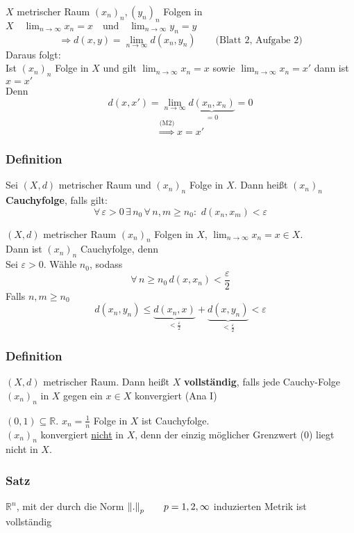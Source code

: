  $X$ metrischer Raum $(x_n)_n , (y_n)_n$ Folgen in $X \quad \lim_{n \to \infty}x_n=x \quad \text{und} \quad \lim_{n \to \infty}y_n=y$
\[
	\Rightarrow d(x,y)=\lim_{n \to \infty}d(x_n,y_n) \qquad \text{(Blatt 2, Aufgabe 2)}
\]
Daraus folgt: \\ Ist $(x_n)_n $ Folge in $X$ und gilt $\lim_{n \to \infty}x_n=x$ sowie $\lim_{n \to \infty}x_n=x'$ dann ist $x=x'$ \\
Denn \[
	d(x,x')=\lim_{n \to \infty}\underset{=0}{\underbrace{d(x_n,x_n)}}=0
\]
\[
	\stackrel{\text{(M2)}}{\Rightarrow} x=x'
\] \bewende

\subsubsection[Cauchyfolge im metrischen Raum]{Definition} %
\label{ssub:definition}
Sei $(X,d)$ metrischer Raum und $(x_n)_n $ Folge in $X$. Dann heißt $(x_n)_n$ {\bfseries Cauchyfolge}, falls gilt:
\[
	\forall\, \varepsilon >0 \, \exists \, n_0 \, \forall\, n,m \geq n_0: \,\, d(x_n,x_m)<\varepsilon 
\]

 $(X,d)$ metrischer Raum $(x_n)_n $ Folgen in $X$, $\lim_{n \to \infty}x_n=x \in X$. \\
Dann ist $(x_n)_n$ Cauchyfolge, denn \\
Sei $\varepsilon >0$. Wähle $n_0$, sodass \[  \forall\, n \geq n_0 \, d(x,x_n)< \frac{\varepsilon}{2} \]
Falls $n,m \geq n_0$
\[
	d(x_n,y_n) \leq \underset{<\frac{\varepsilon}{2}}{\underbrace{d(x_n,x)}} + \underset{<\frac{\varepsilon}{2}}{\underbrace{d(x,y_n)}} < \varepsilon 
\]

\subsubsection[Vollständigkeit]{Definition} %
\label{ssub:definition}
$(X,d)$ metrischer Raum. Dann heißt $X$ {\bfseries vollständig}, falls jede Cauchy-Folge $(x_n)_n $ in $X$ gegen ein $x \in X$ konvergiert (Ana I)


	$(0,1) \subseteq \mathbb{R}$.
	$x_n = \frac{1}{n}$ Folge in $X$ ist Cauchyfolge. \\
	$(x_n)_n$ konvergiert \underline{nicht} in $X$, denn der einzig möglicher Grenzwert (0) liegt nicht in $X$.


\subsubsection{Satz} %
\label{ssub:satz}
$\mathbb{R}^n$, mit der durch die Norm $\norm{.}_p \qquad p=1,2,\infty$ induzierten Metrik ist vollständig

